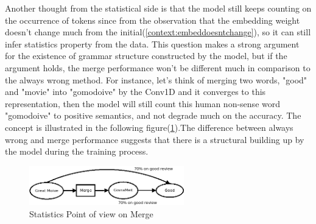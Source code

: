 \documentclass[12pt]{article}
\begin{document}
\label{text:alwayswrongArg}Another thought from the statistical side is that the model still keeps counting on the occurrence of tokens since from the observation that the embedding weight doesn't change much from the initial(\ref{context:embeddoesntchange}), so it can still infer statistics property from the data. This question makes a strong argument for the existence of grammar structure constructed by the model, but if the argument holds, the merge performance won't be different much in comparison to the always wrong method. For instance, let's think of merging two words, "good" and "movie" into "gomodoive" by the Conv1D and it converges to this representation, then the model will still count this human non-sense word "gomodoive" to positive semantics, and not degrade much on the accuracy. The concept is illustrated in the following figure(\ref{fig:merge_nonsense}).The difference between always wrong and merge performance suggests that there is a structural building up by the model during the training process. \\
\begin{figure}[!h] 
    \centering
    \includegraphics[width=0.6\textwidth]{figures/merge_countingArg.png}
    \caption{Statistics Point of view on Merge}
    \label{fig:merge_nonsense}
\end{figure}
\end{document}
